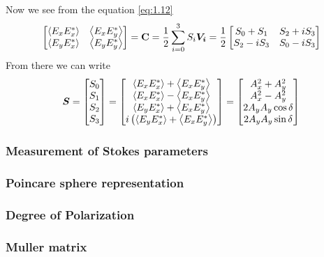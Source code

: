 \documentclass[11pt,a4paper]{article}
\numberwithin{equation}{section}
\begin{document}
Now we see from the equation \ref{eq:1.12}
\begin{align}
	\begin{bmatrix}
		\expval{E_xE_x^\ast} & \expval{E_xE_y^\ast}\\
		\expval{E_yE_x^\ast} & \expval{E_yE_y^\ast}
	\end{bmatrix}=
	\textbf{C} = \frac{1}{2} \sum_{i=0}^{3} S_i \boldsymbol{V_i} = \frac{1}{2}
	\begin{bmatrix}
		S_0+S_1 & S_2+iS_3\\
		S_2-iS_3 & S_0-iS_3
	\end{bmatrix}
\end{align}
From there we can write
\begin{align}
	\boldsymbol{S}= \begin{bmatrix} S_0\\ S_1\\ S_2\\S_3\end{bmatrix} =
	\begin{bmatrix}
		\expval{E_xE_x^\ast} + \expval{E_xE_y^\ast}\\
		\expval{E_xE_x^\ast} - \expval{E_xE_y^\ast}\\
		\expval{E_yE_x^\ast} + \expval{E_xE_y^\ast}\\
		i\left(\expval{E_yE_x^\ast} + \expval{E_xE_y^\ast}\right)
	\end{bmatrix}=
	\begin{bmatrix}
		{A_x^2 + A_y^2}\\
		{A_x^2 - A_y^2}\\
		{2A_yA_y\cos\delta}\\
		{2A_yA_y\sin\delta}
	\end{bmatrix}
\end{align}
\subsubsection{Measurement of Stokes parameters}

\subsubsection{Poincare sphere representation}

\subsubsection{Degree of Polarization}

\subsubsection{Muller matrix}
\end{document}
